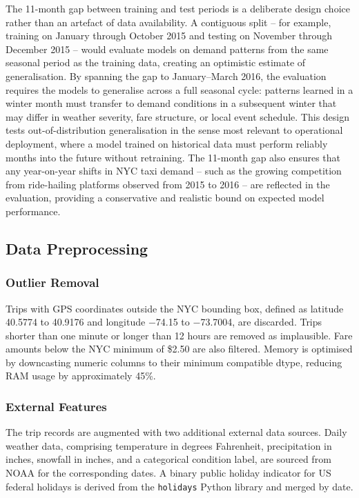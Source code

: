 \documentclass[a4paper,fleqn]{cas-dc}
\begin{document}
The 11-month gap between training and test periods is a deliberate design choice rather than an artefact of data availability.  A contiguous split -- for example, training on January through October 2015 and testing on November through December 2015 -- would evaluate models on demand patterns from the same seasonal period as the training data, creating an optimistic estimate of generalisation.  By spanning the gap to January--March 2016, the evaluation requires the models to generalise across a full seasonal cycle: patterns learned in a winter month must transfer to demand conditions in a subsequent winter that may differ in weather severity, fare structure, or local event schedule.  This design tests out-of-distribution generalisation in the sense most relevant to operational deployment, where a model trained on historical data must perform reliably months into the future without retraining.  The 11-month gap also ensures that any year-on-year shifts in NYC taxi demand -- such as the growing competition from ride-hailing platforms observed from 2015 to 2016 -- are reflected in the evaluation, providing a conservative and realistic bound on expected model performance.

\subsection{Data Preprocessing}

\subsubsection{Outlier Removal}
Trips with GPS coordinates outside the NYC bounding box, defined as latitude 40.5774 to 40.9176 and longitude $-$74.15 to $-$73.7004, are discarded.  Trips shorter than one minute or longer than 12 hours are removed as implausible.  Fare amounts below the NYC minimum of \$2.50 are also filtered.  Memory is optimised by downcasting numeric columns to their minimum compatible dtype, reducing RAM usage by approximately 45\%.

\subsubsection{External Features}
The trip records are augmented with two additional external data sources.  Daily weather data, comprising temperature in degrees Fahrenheit, precipitation in inches, snowfall in inches, and a categorical condition label, are sourced from NOAA for the corresponding dates.  A binary public holiday indicator for US federal holidays is derived from the \texttt{holidays} Python library and merged by date.
\end{document}
